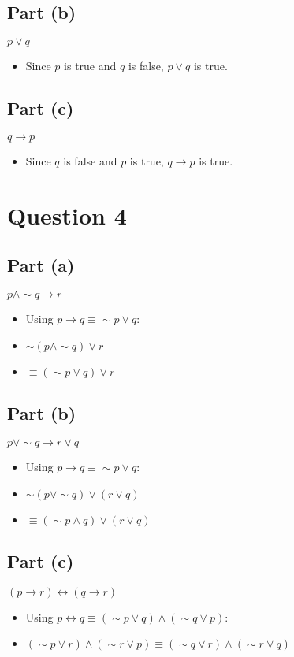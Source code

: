 \documentclass{article}
\begin{document}
\subsection{Part (b)}
$p \lor q$
\begin{itemize}
    \item Since $p$ is true and $q$ is false, $p \lor q$ is true.
\end{itemize}

\subsection{Part (c)}
$q \to p$
\begin{itemize}
    \item Since $q$ is false and $p$ is true, $q \to p$ is true.
\end{itemize}

\section{Question 4}
\subsection{Part (a)}
$p \land \sim q \to r$
\begin{itemize}
    \item Using $p \to q \equiv \sim p \lor q$: 
    \item $\sim(p \land \sim q) \lor r$
    \item $\equiv (\sim p \lor q) \lor r$
\end{itemize}

\subsection{Part (b)}
$p \lor \sim q \to r \lor q$
\begin{itemize}
    \item Using $p \to q \equiv \sim p \lor q$:
    \item $\sim (p \lor \sim q) \lor (r \lor q)$
    \item $\equiv (\sim p \land q) \lor (r \lor q)$
\end{itemize}

\subsection{Part (c)}
$(p \to r) \leftrightarrow (q \to r)$
\begin{itemize}
    \item Using $p \leftrightarrow q \equiv (\sim p \lor q) \land (\sim q \lor p)$: 
    \item $(\sim p \lor r) \land (\sim r \lor p) \equiv (\sim q \lor r) \land (\sim r \lor q)$
\end{itemize}
\end{document}
